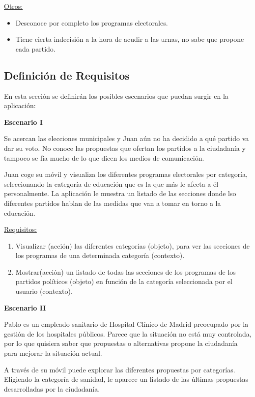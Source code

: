 \underline{Otros:}

\begin{itemize}
\item Desconoce por completo los programas electorales. 
\item Tiene cierta indecisión a la hora de acudir a las urnas, no sabe que propone cada partido.
\end{itemize}

\subsection{Definición de Requisitos}

En esta sección se definirán los posibles escenarios que puedan surgir en la aplicación:

\textbf{Escenario I}

Se acercan las elecciones municipales y Juan aún no ha decidido a qué partido va dar su voto. No conoce las propuestas que ofertan los partidos a la ciudadanía y tampoco se fía mucho de lo que dicen los medios de comunicación.

Juan coge su móvil y visualiza los diferentes programas electorales por categoría, seleccionando la categoría de educación que es la que más le afecta a él personalmente. La aplicación le muestra un listado de las secciones donde lso diferentes partidos hablan de las medidas que van a tomar en torno a la educación.

\underline{Requisitos:}

\begin{enumerate}
\item Visualizar (acción) las diferentes categorías (objeto), para ver las secciones de los programas de una determinada categoría (contexto).
\item Mostrar(acción) un listado de todas las secciones de los programas de los partidos  políticos (objeto) en función de la categoría seleccionada por el usuario (contexto).
\end{enumerate}

\textbf{Escenario II}

Pablo es un empleado sanitario de Hospital Clínico de Madrid preocupado por la gestión de los hospitales públicos. Parece que la situación no está muy controlada, por lo que quisiera saber que propuestas o alternativas propone la ciudadanía para mejorar la situación actual.

A través de su móvil puede explorar las diferentes propuestas por categorías. Eligiendo la categoría de sanidad, le aparece un listado de las últimas propuestas desarrolladas por la ciudadanía.

